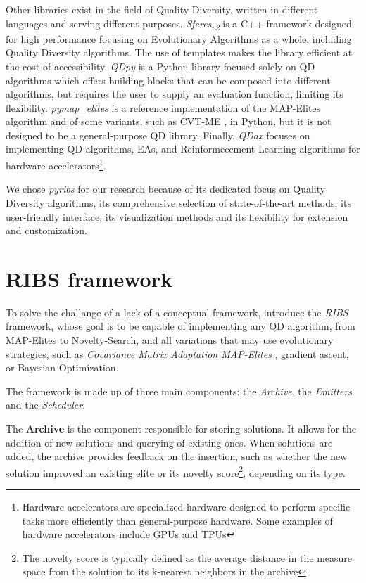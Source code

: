 \documentclass{Configuration_Files/PoliMi3i_thesis}
\begin{document}
Other libraries exist in the field of Quality Diversity, written in different languages and serving different purposes. \textit{Sferes\textsubscript{v2}} \cite{mouret_sferesv2_2010} is a C++ framework designed for high performance focusing on Evolutionary Algorithms as a whole, including Quality Diversity algorithms. The use of templates makes the library efficient at the cost of accessibility. 
\textit{QDpy} \cite{cazenille_qdpy_2018} is a Python library focused solely on QD algorithms which offers building blocks that can be composed into different algorithms, but requires the user to supply an evaluation function, limiting its flexibility. 
\textit{pymap\_elites} \cite{mouret_python3_2019}  is a reference implementation of the MAP-Elites algorithm and of some variants, such as CVT-ME \cite{vassiliades_using_2017}, in Python, but it is not designed to be a general-purpose QD library.
Finally, \textit{QDax} \cite{lim_accelerated_2022} focuses on implementing QD algorithms, EAs, and Reinformecement Learning algorithms for hardware accelerators\footnote{Hardware accelerators are specialized hardware designed to perform specific tasks more efficiently than general-purpose hardware. Some examples of hardware accelerators include GPUs and TPUs}.

We chose \textit{pyribs} for our research because of its dedicated focus on Quality Diversity algorithms, its comprehensive selection of state-of-the-art methods, its user-friendly interface, its visualization methods and its flexibility for extension and customization. 

\section{RIBS framework}
\label{sec:ribs}

To solve the challange of a lack of a conceptual framework, \citeauthor{tjanaka_pyribs_2023} introduce the \textit{RIBS} framework, whose goal is to be capable of implementing any QD algorithm, from MAP-Elites to Novelty-Search, and all variations that may use evolutionary strategies, such as  \textit{Covariance Matrix Adaptation MAP-Elites} \cite{fontaine_covariance_2020}, gradient ascent, or Bayesian Optimization.

The framework is made up of three main components: the \textit{Archive}, the \textit{Emitters} and the \textit{Scheduler}.

The \textbf{Archive} is the component responsible for storing solutions. It allows for the addition of new solutions and querying of existing ones. When solutions are added, the archive provides feedback on the insertion, such as whether the new solution improved an existing elite or its novelty score\footnote{The novelty score is typically defined as the average distance in the measure space from the solution to its k-nearest neighbors in the archive}, depending on its type.
\end{document}

